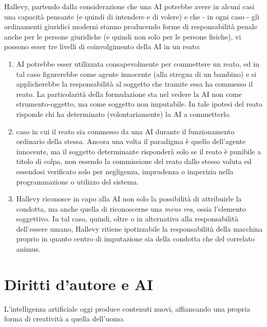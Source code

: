 Hallevy, partendo dalla considerazione che una AI potrebbe avere in alcuni casi una capacità pensante (e quindi di intendere e di volere) e che - in ogni caso - gli ordinamenti giuridici moderni stanno producendo forme di responsabilità penale anche per le persone giuridiche (e quindi non solo per le persone fisiche), vi possono esser tre livelli di coinvolgimento della AI in un reato:\
\begin{enumerate}
    \item AI potrebbe esser utilizzata consapevolmente per commettere un reato, ed in tal caso figurerebbe come agente innocente (alla stregua di un bambino) e si applicherebbe la responsabilità al soggetto che tramite essa ha commesso il reato. La particolarità della formulazione sta nel vedere la AI non come strumento-oggetto, ma come soggetto non imputabile. In tale ipotesi del reato risponde chi ha determinato (volontariamente) la AI a commetterlo.
    \item caso in cui il reato sia commesso da una AI durante il funzionamento ordinario della stessa. Ancora una volta il paradigma è quello dell’agente innocente, ma il soggetto determinante risponderà solo se il reato è punibile a titolo di colpa, non essendo la commissione del reato dallo stesso voluta ed essendosi verificato solo per negligenza, imprudenza o imperizia nella programmazione o utilizzo del sistema.
    \item Hallevy riconosce in capo alla AI non solo la possibilità di attribuirle la condotta, ma anche quella di riconoscerne una \textit{mens rea}, ossia l’elemento soggettivo. In tal caso, quindi, oltre o in alternativa alla responsabilità dell’essere umano, Hallevy ritiene ipotizzabile la responsabilità della macchina proprio in quanto centro di imputazione sia della condotta che del correlato animus.
\end{enumerate}

\section{Diritti d'autore e AI}
L'intelligenza artificiale oggi produce contenuti nuovi, affiancando una propria forma di creatività a quella dell'uomo. 
